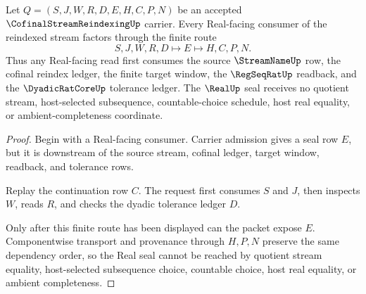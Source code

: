 \begin{theorem}
\label{thm:cofinal-stream-reindexing-real-seal-nonescape}
Let $Q=(S,J,W,R,D,E,H,C,P,N)$ be an accepted $\CofinalStreamReindexingUp$ carrier. Every Real-facing consumer of the reindexed stream factors through the finite route
$$
S,J,W,R,D \longmapsto E \longmapsto H,C,P,N .
$$
Thus any Real-facing read first consumes the source $\StreamNameUp$ row, the cofinal reindex ledger, the finite target window, the $\RegSeqRatUp$ readback, and the $\DyadicRatCoreUp$ tolerance ledger. The $\RealUp$ seal receives no quotient stream, host-selected subsequence, countable-choice schedule, host real equality, or ambient-completeness coordinate.
\end{theorem}
\begin{proof}
Begin with a Real-facing consumer. Carrier admission gives a seal row $E$, but it is downstream of the source stream, cofinal ledger, target window, readback, and tolerance rows.

Replay the continuation row $C$. The request first consumes $S$ and $J$, then inspects $W$, reads $R$, and checks the dyadic tolerance ledger $D$.

Only after this finite route has been displayed can the packet expose $E$. Componentwise transport and provenance through $H,P,N$ preserve the same dependency order, so the Real seal cannot be reached by quotient stream equality, host-selected subsequence choice, countable choice, host real equality, or ambient completeness.
\end{proof}


\begin{closurestatus}{\CofinalStreamReindexingUp}
  \theoryclosure{\seedClosure}
  \formalstatus{\unformalizedV}
\end{closurestatus}
